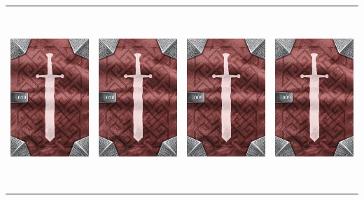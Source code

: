\documentclass{minimal}
\begin{document}
{\begin{longtable}{llll}
\includegraphics[width=44mm,height=68mm]{./1-14/gh-010-war-hammer-back.png} &
\includegraphics[width=44mm,height=68mm]{./1-14/gh-010-war-hammer-back.png} &
\includegraphics[width=44mm,height=68mm]{./1-14/gh-009-piercing-bow-back.png} &
\includegraphics[width=44mm,height=68mm]{./1-14/gh-009-piercing-bow-back.png}\\ 

\end{longtable}}
\end{document}
